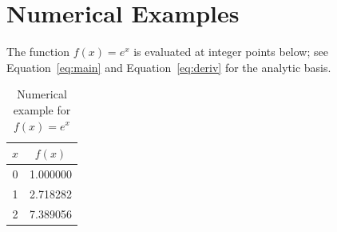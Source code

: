\documentclass{article}
\begin{document}
\section{Numerical Examples}
The function $f(x) = e^x$ is evaluated at integer points below; see
Equation~\ref{eq:main} and Equation~\ref{eq:deriv} for the analytic basis.
\begin{table}[h]
\centering
\begin{tabular}{|c|c|}
\hline
$x$ & $f(x)$ \\
\hline
0 & 1.000000 \\
1 & 2.718282 \\
2 & 7.389056 \\
\hline
\end{tabular}
\caption{Numerical example for $f(x) = e^x$}
\end{table}
\end{document}
